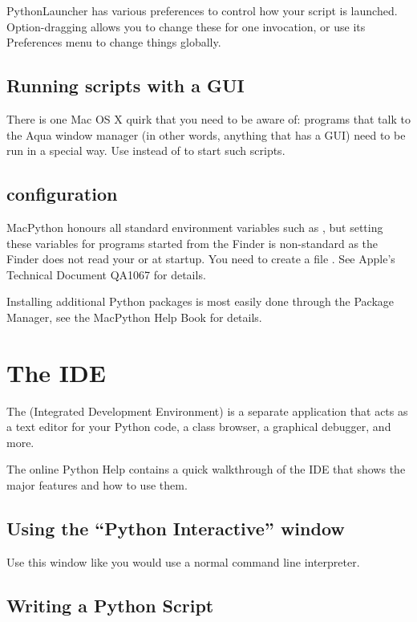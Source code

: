 PythonLauncher has various preferences to control how your script is launched.
Option-dragging allows you to change these for one invocation, or use its
Preferences menu to change things globally.

\subsection{Running scripts with a GUI \label{osx-gui-scripts}}

There is one Mac OS X quirk that you need to be aware of: programs
that talk to the Aqua window manager (in other words, anything that has a GUI)
need to be run in a special way. Use  instead of 
to start such scripts.

\subsection{configuration}

MacPython honours all standard \UNIX{} environment variables such as
, but setting these variables for programs started
from the Finder is non-standard
as the Finder does not read your  or  at startup.
You need to create a file .
See Apple's Technical Document QA1067 for details.

Installing additional Python packages is most easily done through the
Package Manager, see the MacPython Help Book for details.


\section{The IDE\label{IDE}}

The  (Integrated Development Environment) is a
separate application that acts as a text editor for your Python code,
a class browser, a graphical debugger, and more.

The online Python Help contains a quick walkthrough of the IDE that
shows the major features and how to use them.

\subsection{Using the ``Python Interactive'' window}

Use this window like you would use a normal \UNIX{} command line
interpreter.

\subsection{Writing a Python Script \label{IDEwrite}}

